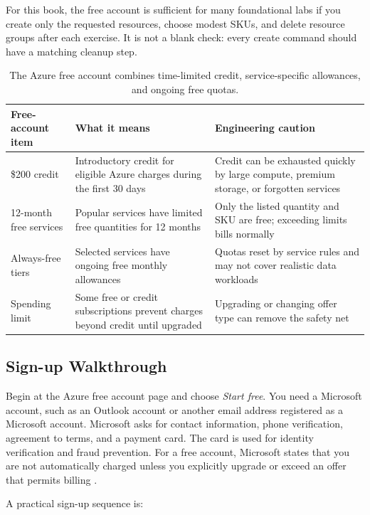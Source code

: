 For this book, the free account is sufficient for many foundational labs if you create only the requested resources, choose modest SKUs, and delete resource groups after each exercise. It is not a blank check: every create command should have a matching cleanup step.

\begin{table}[H]
\centering
\small
\begin{tabular}{@{}p{3.0cm}p{5.1cm}p{5.0cm}@{}}
\toprule
\textbf{Free-account item} & \textbf{What it means} & \textbf{Engineering caution} \\
\midrule
\$200 credit & Introductory credit for eligible Azure charges during the first 30 days & Credit can be exhausted quickly by large compute, premium storage, or forgotten services \\
12-month free services & Popular services have limited free quantities for 12 months & Only the listed quantity and SKU are free; exceeding limits bills normally \\
Always-free tiers & Selected services have ongoing free monthly allowances & Quotas reset by service rules and may not cover realistic data workloads \\
Spending limit & Some free or credit subscriptions prevent charges beyond credit until upgraded & Upgrading or changing offer type can remove the safety net \\
\bottomrule
\end{tabular}
\caption{The Azure free account combines time-limited credit, service-specific allowances, and ongoing free quotas.}
\label{tab:azure-free-offer}
\end{table}

\subsection{Sign-up Walkthrough}
Begin at the Azure free account page and choose \textit{Start free}. You need a Microsoft account, such as an Outlook account or another email address registered as a Microsoft account. Microsoft asks for contact information, phone verification, agreement to terms, and a payment card. The card is used for identity verification and fraud prevention. For a free account, Microsoft states that you are not automatically charged unless you explicitly upgrade or exceed an offer that permits billing \cite{microsoft2025azureFreeAccount}.

A practical sign-up sequence is:

